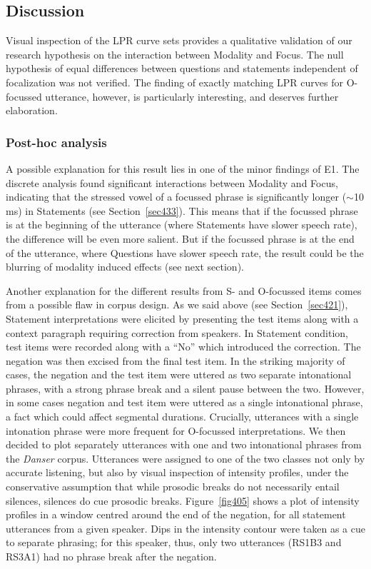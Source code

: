 \subsection{Discussion}\label{sec444}
Visual inspection of the LPR curve sets provides a qualitative validation of our research hypothesis on the interaction between Modality and Focus. The null hypothesis of equal differences between questions and statements independent of focalization was not verified. The finding of exactly matching LPR curves for O-focussed utterance, however, is particularly interesting, and deserves further elaboration.

\subsubsection{Post-hoc analysis}\label{sec4441}
A possible explanation for this result lies in one of the minor findings of E1. The discrete analysis found significant interactions between Modality and Focus, indicating that the stressed vowel of a focussed phrase is significantly longer ($ \sim $10 ms) in Statements (see Section~\ref{sec433}). This means that if the focussed phrase is at the beginning of the utterance (where Statements have slower speech rate), the difference will be even more salient. But if the focussed phrase is at the end of the utterance, where Questions have slower speech rate, the result could be the blurring of modality induced effects (see next section).

Another explanation for the different results from S- and O-focussed items comes from a possible flaw in corpus design. As we said above (see Section~\ref{sec421}), Statement interpretations were elicited by presenting the test items along with a context paragraph requiring correction from speakers. In Statement condition, test items were recorded along with a ``No'' which introduced the correction. The negation was then excised from the final test item. In the striking majority of cases, the negation and the test item were uttered as two separate intonational phrases, with a strong phrase break and a silent pause between the two. However, in some cases negation and test item were uttered as a single intonational phrase, a fact which could affect segmental durations. Crucially, utterances with a single intonation phrase were more frequent for O-focussed interpretations. We then decided to plot separately utterances with one and two intonational phrases from the \textit{Danser} corpus. Utterances were assigned to one of the two classes not only by accurate listening, but also by visual inspection of intensity profiles, under the conservative assumption that while prosodic breaks do not necessarily entail silences, silences do cue prosodic breaks. Figure~\ref{fig405} shows a plot of intensity profiles in a window centred around the end of the negation, for all statement utterances from a given speaker. Dips in the intensity contour were taken as a cue to separate phrasing; for this speaker, thus, only two utterances (RS1B3 and RS3A1) had no phrase break after the negation.

